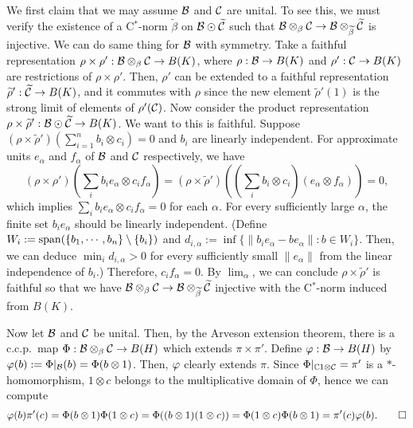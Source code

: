 \documentclass{../../../small}
\begin{document}
\begin{pf}
We first claim that we may assume $\mathcal{B}$ and $\mathcal{C}$ are unital.
To see this, we must verify the existence of a C$^*$-norm $\tilde\beta$ on $\mathcal{B}\odot\widetilde{\mathcal{C}}$ such that $\mathcal{B}\otimes_\beta\mathcal{C}\to\mathcal{B}\otimes_{\widetilde\beta}\widetilde{\mathcal{C}}$ is injective.
We can do same thing for $\mathcal{B}$ with symmetry.
Take a faithful representation $\rho\times\rho':\mathcal{B}\otimes_\beta\mathcal{C}\to B(K)$, where $\rho:\mathcal{B}\to B(K)$ and $\rho':\mathcal{C}\to B(K)$ are restrictions of $\rho\times\rho'$.
Then, $\rho'$ can be extended to a faithful representation $\widetilde\rho':\widetilde{\mathcal{C}}\to B(K)$, and it commutes with $\rho$ since the new element $\tilde\rho'(1)$ is the strong limit of elements of $\rho'(\mathcal{C})$.
Now consider the product representation $\rho\times\widetilde\rho':\mathcal{B}\odot\widetilde{\mathcal{C}}\to B(K)$.
We want to this is faithful.
Suppose $(\rho\times\tilde\rho')(\sum_{i=1}^nb_i\otimes c_i)=0$ and $b_i$ are linearly independent.
For approximate units $e_\alpha$ and $f_\alpha$ of $\mathcal{B}$ and $\mathcal{C}$ respectively, we have
\[(\rho\times\rho')(\sum_ib_ie_\alpha\otimes c_if_\alpha)=(\rho\times\tilde\rho')((\sum_ib_i\otimes c_i)(e_\alpha\otimes f_\alpha))=0,\]
which implies $\sum_ib_ie_\alpha\otimes c_if_\alpha=0$ for each $\alpha$.
For every sufficiently large $\alpha$, the finite set $b_ie_\alpha$ should be linearly independent.
(Define $W_i:=\operatorname{span}(\{b_1,\cdots,b_n\}\setminus\{b_i\})$ and $d_{i,\alpha}:=\inf\{\|b_ie_\alpha-be_\alpha\|:b\in W_i\}$. Then, we can deduce $\min_id_{i,\alpha}>0$ for every sufficiently small $\|e_\alpha\|$ from the linear independence of $b_i$.)
Therefore, $c_if_\alpha=0$.
By $\lim_\alpha$, we can conclude $\rho\times\tilde\rho'$ is faithful so that we have $\mathcal{B}\otimes_\beta\mathcal{C}\to\mathcal{B}\otimes_{\widetilde\beta}\widetilde{\mathcal{C}}$ injective with the C$^*$-norm induced from $B(K)$.

Now let $\mathcal{B}$ and $\mathcal{C}$ be unital.
Then, by the Arveson extension theorem, there is a c.c.p.~map $\Phi:\mathcal{B}\otimes_\beta\mathcal{C}\to B(H)$ which extends $\pi\times\pi'$.
Define $\varphi:\mathcal{B}\to B(H)$ by $\varphi(b):=\Phi|_{\mathcal{B}}(b)=\Phi(b\otimes1)$.
Then, $\varphi$ clearly extends $\pi$.
Since $\Phi|_{\mathbb{C}1\otimes\mathcal{C}}=\pi'$ is a $*$-homomorphism, $1\otimes c$ belongs to the multiplicative domain of $\Phi$, hence we can compute
\[\varphi(b)\pi'(c)=\Phi(b\otimes1)\Phi(1\otimes c)=\Phi((b\otimes1)(1\otimes c))=\Phi(1\otimes c)\Phi(b\otimes1)=\pi'(c)\varphi(b).\qedhere\]
\end{pf}
\end{document}

